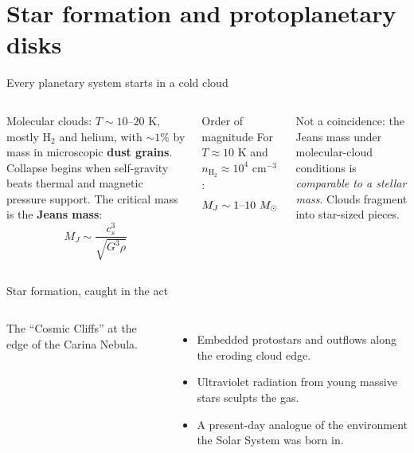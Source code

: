 \documentclass[aspectratio=169, 11pt]{beamer}
\begin{document}
\section{Star formation and protoplanetary disks}

\begin{frame}{Every planetary system starts in a cold cloud}
  \begin{columns}[T]
    Molecular clouds: $T \sim 10$--$20$ K, mostly $\mathrm{H_2}$ and helium, with $\sim 1\%$ by mass in microscopic \textbf{dust grains}.
    \vskip6pt\relax
    Collapse begins when self-gravity beats thermal and magnetic pressure support. The critical mass is the \textbf{Jeans mass}:
    \[
      M_J \sim \frac{c_s^3}{\sqrt{G^3 \rho}}
    \]

    \begin{block}{Order of magnitude}
      For $T \approx 10$ K and $n_{\mathrm{H_2}} \approx 10^4$ cm$^{-3}$:
      \[
        M_J \sim 1\text{--}10\ M_{\odot}
      \]
    \end{block}
    \vskip8pt\relax
    Not a coincidence: the Jeans mass under molecular-cloud conditions is \emph{comparable to a stellar mass}. Clouds fragment into star-sized pieces.
  \end{columns}
\end{frame}

\begin{frame}{Star formation, caught in the act}
  \begin{columns}[c]
    \column{\recapfigcol}
    \centering

    \column{\recaptextcol}
    The ``Cosmic Cliffs'' at the edge of the Carina Nebula.
    \vskip6pt\relax
    \begin{itemize}
      \item Embedded protostars and outflows along the eroding cloud edge.
      \item Ultraviolet radiation from young massive stars sculpts the gas.
      \item A present-day analogue of the environment the Solar System was born in.
    \end{itemize}
  \end{columns}
\end{frame}
\end{document}
